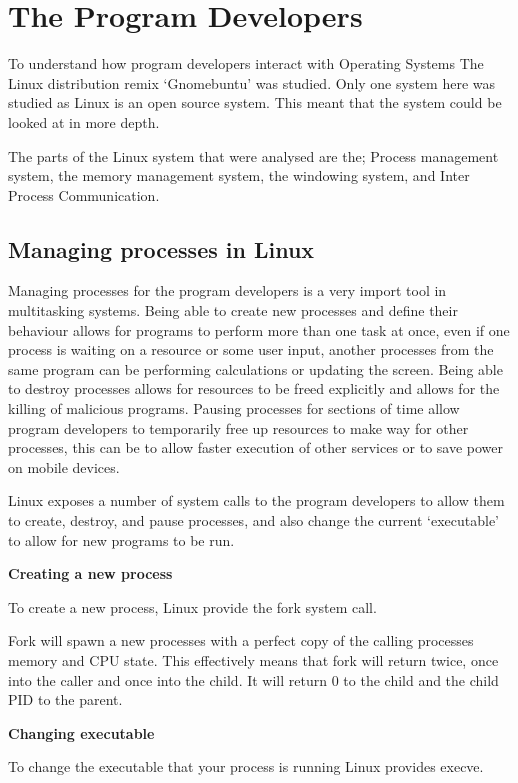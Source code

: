 \documentclass[a4paper]{report}
\begin{document}
\section{The Program Developers}

To understand how program developers interact with Operating Systems The Linux distribution remix `Gnomebuntu' was studied. Only one system here was studied as Linux is an open source system. This meant that the system could be looked at in more depth.

The parts of the Linux system that were analysed are the; Process management system, the memory management system, the windowing system, and Inter Process Communication.

\subsection{Managing processes in Linux}

Managing processes for the program developers is a very import tool in multitasking systems. Being able to create new processes and define their behaviour allows for programs to perform more than one task at once, even if one process is waiting on a resource or some user input, another processes from the same program can be performing calculations or updating the screen. Being able to destroy processes allows for resources to be freed explicitly and allows for the killing of malicious programs. Pausing processes for sections of time allow program developers to temporarily free up resources to make way for other processes, this can be to allow faster execution of other services or to save power on mobile devices.

Linux exposes a number of system calls to the program developers to allow them to create, destroy, and pause processes, and also change the current `executable' to allow for new programs to be run.

\noindent
\textbf{Creating a new process}

To create a new process, Linux provide the fork system call. \cite{manFork}

Fork will spawn a new processes with a perfect copy of the calling processes memory and CPU state. This effectively means that fork will return twice, once into the caller and once into the child. It will return 0 to the child and the child PID to the parent.

\noindent
\textbf{Changing executable}

To change the executable that your process is running Linux provides execve. \cite{manExecve}
\end{document}
